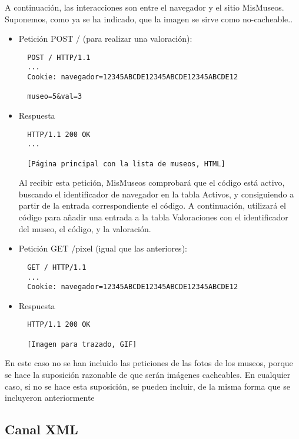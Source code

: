 A continuación, las interacciones son entre el navegador y el sitio MisMuseos. Suponemos, como ya se ha indicado, que la imagen se sirve como no-cacheable..

\begin{itemize}
\item Petición POST / (para realizar una valoración):

\begin{verbatim}
  POST / HTTP/1.1
  ...
  Cookie: navegador=12345ABCDE12345ABCDE12345ABCDE12

  museo=5&val=3
\end{verbatim}

\item Respuesta

\begin{verbatim}
  HTTP/1.1 200 OK
  ...

  [Página principal con la lista de museos, HTML]
\end{verbatim}

Al recibir esta petición, MisMuseos comprobará que el código está activo, buscando el identificador de navegador en la tabla Activos, y consiguiendo a partir de la entrada correspondiente el código. A continuación, utilizará el código para añadir una entrada a la tabla Valoraciones con el identificador del museo, el código, y la valoración.

\item Petición GET /pixel (igual que las anteriores):

\begin{verbatim}
  GET / HTTP/1.1
  ...
  Cookie: navegador=12345ABCDE12345ABCDE12345ABCDE12
\end{verbatim}

\item Respuesta

\begin{verbatim}
  HTTP/1.1 200 OK

  [Imagen para trazado, GIF]
\end{verbatim}

\end{itemize}

En este caso no se han incluido las peticiones de las fotos de los museos, porque se hace la suposición razonable de que serán imágenes cacheables. En cualquier caso, si no se hace esta suposición, se pueden incluir, de la misma forma que se incluyeron anteriormente

\subsection*{Canal XML}


